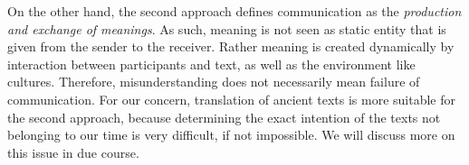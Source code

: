 On the other hand, the second approach defines communication as the \emph{production and exchange of meanings}. As such, meaning is not seen as static entity that is given from the sender to the receiver. Rather meaning is created dynamically by interaction between participants and text, as well as the environment like cultures. Therefore, misunderstanding does not necessarily mean failure of communication. For our concern, translation of ancient texts is more suitable for the second approach, because determining the exact intention of the texts not belonging to our time is very difficult, if not impossible. We will discuss more on this issue in due course.
